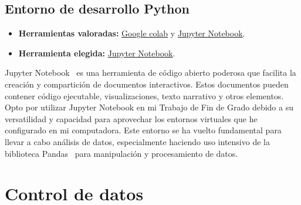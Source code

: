 \subsection{Entorno de desarrollo Python}\label{4:Python}
\begin{itemize}
    \item \textbf{Herramientas valoradas:} \href{https://colab.google/}{Google colab} y \href{https://jupyter.org/}{Jupyter Notebook}.
    \item \textbf{Herramienta elegida:} \href{https://jupyter.org/}{Jupyter Notebook}.
\end{itemize}

Jupyter Notebook~\cite{misc:Jupyter_Notebook} es una herramienta de código abierto poderosa que facilita la creación y compartición de documentos interactivos. Estos documentos pueden contener código ejecutable, visualizaciones, texto narrativo y otros elementos. Opto por utilizar Jupyter Notebook en mi Trabajo de Fin de Grado debido a su versatilidad y capacidad para aprovechar los entornos virtuales que he configurado en mi computadora. Este entorno se ha vuelto fundamental para llevar a cabo análisis de datos, especialmente haciendo uso intensivo de la biblioteca Pandas~\cite{misc:Pandas} para manipulación y procesamiento de datos.
\pagebreak
\section{Control de datos}

